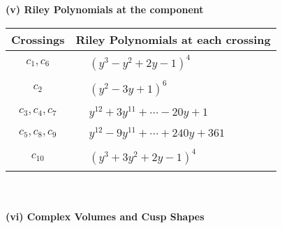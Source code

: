 \documentclass[1p]{elsarticle_modified}
\theoremstyle{definition}
\begin{document}
\newpage\renewcommand{\arraystretch}{1}
\flushleft \textbf{(v) Riley Polynomials at the component}\newline \\
\begin{tabular}{m{50pt}|m{274pt}}
Crossings & \hspace{64pt}Riley Polynomials at each crossing \\
\hline $$\begin{aligned}c_{1},c_{6}\end{aligned}$$&$\begin{aligned}
&(y^3- y^2+2 y-1)^4
\end{aligned}$\\
\hline $$\begin{aligned}c_{2}\end{aligned}$$&$\begin{aligned}
&(y^2-3 y+1)^6
\end{aligned}$\\
\hline $$\begin{aligned}c_{3},c_{4},c_{7}\end{aligned}$$&$\begin{aligned}
&y^{12}+3 y^{11}+\cdots-20 y+1
\end{aligned}$\\
\hline $$\begin{aligned}c_{5},c_{8},c_{9}\end{aligned}$$&$\begin{aligned}
&y^{12}-9 y^{11}+\cdots+240 y+361
\end{aligned}$\\
\hline $$\begin{aligned}c_{10}\end{aligned}$$&$\begin{aligned}
&(y^3+3 y^2+2 y-1)^4
\end{aligned}$\\
\hline
\end{tabular}\\~\\
\newpage\flushleft \textbf{(vi) Complex Volumes and Cusp Shapes}
\end{document}

